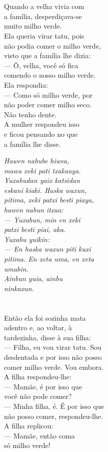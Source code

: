 \chapter{}

Quando a velha vivia com\\
a família, desperdiçava-se\\
muito milho verde.\\
Ela queria virar tatu, pois\\
não podia comer o milho verde,\\
visto que a família lhe dizia:\\
--- Ô, velha, você só fica\\
comendo o nosso milho verde.\\
Ela respondia:\\
--- Como só milho verde, por\\
não poder comer milho seco.\\
Não tenho dente.\\
A mulher respondeu isso\\
e ficou pensando no que\\
a família lhe disse.

\textit{Hawen nabube hiwea,\\
mawa xeki pati txakaaya.\\
Yuxabudan yaix katsidan\\
eskani kiaki. Haska waxun,\\
pitima, xeki patxi besti piaya,\\
hawen nabun itxaa:\\
--- Yuxabun, min en xeki\\
patxi besti piai, aka.\\
Yuxabu yuikin:\\
--- En haska waxun piti kuxi\\
pitima. En xeta uma, en xeta\\
umabin.\\
Ainbun yuia, ainbu\\
ninkaxun.}

\chapter{}

Então ela foi sozinha mata\\
adentro e, ao voltar, à\\
tardezinha, disse à sua filha:\\
--- Filha, eu vou virar tatu. Sou\\
desdentada e por isso não posso\\
comer milho verde. Vou embora.\\
A filha respondeu-lhe:\\
--- Mamãe, é por isso que\\
você não pode comer?\\
--- Minha filha, é. É por isso que\\
não posso comer, respondeu-lhe.\\
A filha replicou:\\
--- Mamãe, então coma\\
só milho verde!

